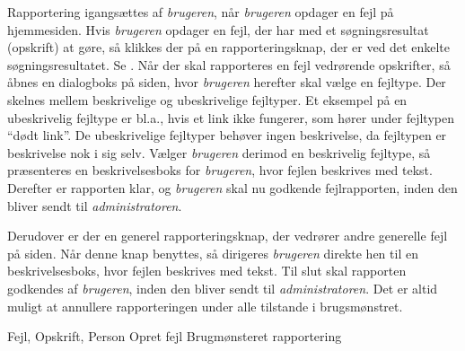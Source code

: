 {Rapportering igangsættes af \textit{brugeren}, når \textit{brugeren} opdager en fejl på hjemmesiden. Hvis \textit{brugeren} opdager en fejl, der har med et søgningsresultat (opskrift) at gøre, så klikkes der på en rapporteringsknap, der er ved det enkelte søgningsresultatet. Se . Når der skal rapporteres en fejl vedrørende opskrifter, så åbnes en dialogboks på siden, hvor \textit{brugeren} herefter skal vælge en fejltype. Der skelnes mellem beskrivelige og ubeskrivelige fejltyper. Et eksempel på en ubeskrivelig fejltype er bl.a., hvis et link ikke fungerer, som hører under fejltypen “dødt link”. De ubeskrivelige fejltyper behøver ingen beskrivelse, da fejltypen er beskrivelse nok i sig selv. Vælger \textit{brugeren} derimod en beskrivelig fejltype, så præsenteres en beskrivelsesboks for \textit{brugeren}, hvor fejlen beskrives med tekst. Derefter er rapporten klar, og \textit{brugeren} skal nu godkende fejlrapporten, inden den bliver sendt til \textit{administratoren}.

Derudover er der en generel rapporteringsknap, der vedrører andre generelle fejl på siden. Når denne knap benyttes, så dirigeres \textit{brugeren} direkte hen til en beskrivelsesboks, hvor fejlen beskrives med tekst. Til slut skal rapporten godkendes af \textit{brugeren}, inden den bliver sendt til \textit{administratoren}. Det er altid muligt at annullere rapporteringen under alle tilstande i brugsmønstret.}
{Fejl, Opskrift, Person}
{Opret fejl}
{Brugmønsteret rapportering}

